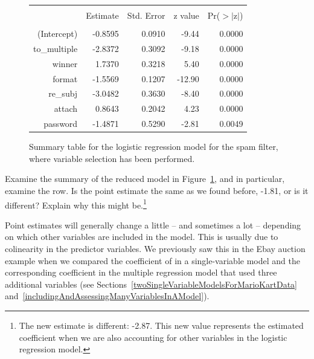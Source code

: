 \begin{figure}[ht]
\centering
\begin{tabular}{rrrrr}
  \hline
  \vspace{-3.7mm} & & & & \\
 & Estimate & Std. Error & z value & Pr($>$$|$z$|$) \\ 
  \hline
  \vspace{-3.8mm} & & & & \\
(Intercept) & -0.8595 & 0.0910 & -9.44 & 0.0000 \\ 
  to\_\hspace{0.3mm}multiple & -2.8372 & 0.3092 & -9.18 & 0.0000 \\ 
  winner & 1.7370 & 0.3218 & 5.40 & 0.0000 \\ 
  format & -1.5569 & 0.1207 & -12.90 & 0.0000 \\ 
  re\_\hspace{0.3mm}subj & -3.0482 & 0.3630 & -8.40 & 0.0000 \\ 
  attach & 0.8643 & 0.2042 & 4.23 & 0.0000 \\ 
  password & -1.4871 & 0.5290 & -2.81 & 0.0049 \\ 
\hline
\end{tabular}
\caption{Summary table for the logistic regression model for the spam filter, where variable selection has been performed.}
\label{emailLogisticReducedModel}
\end{figure}

\begin{exercise}
Examine the summary of the reduced model in Figure~\ref{emailLogisticReducedModel}, and in particular, examine the  row. Is the point estimate the same as we found before, -1.81, or is it different? Explain why this might be.\footnote{The new estimate is different: -2.87. This new value represents the estimated coefficient when we are also accounting for other variables in the logistic regression model.}
\end{exercise}

Point estimates will generally change a little -- and sometimes a lot -- depending on which other variables are included in the model. This is usually due to colinearity in the predictor variables. We previously saw this in the Ebay auction example when we compared the coefficient of  in a single-variable model and the corresponding coefficient in the multiple regression model that used three additional variables (see Sections~\ref{twoSingleVariableModelsForMarioKartData} and~\ref{includingAndAssessingManyVariablesInAModel}).

